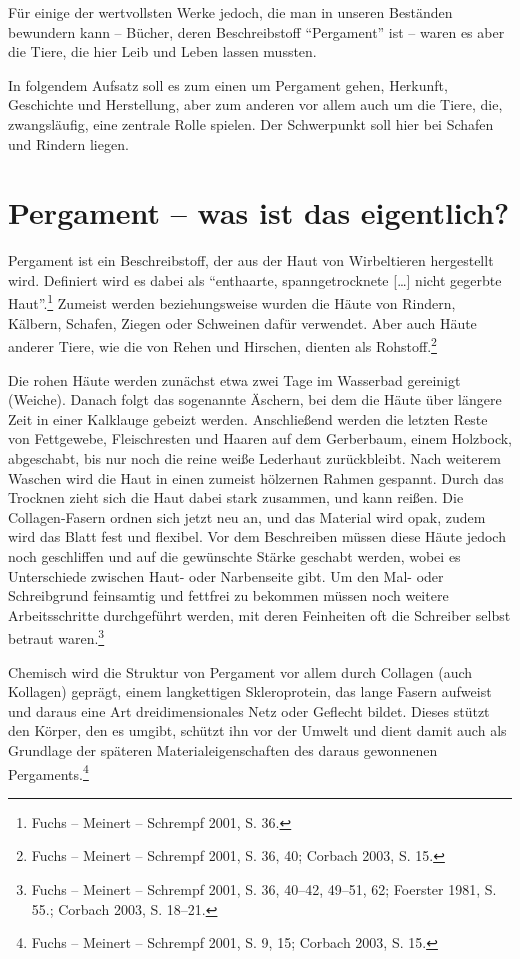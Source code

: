 \documentclass[a4paper,
fontsize=11pt,
oneside,
numbers=noperiodatend,
parskip=half-,
bibliography=totoc,
final
]{scrartcl}
\begin{document}
Für einige der wertvollsten Werke jedoch, die man in unseren Beständen
bewundern kann – Bücher, deren Beschreibstoff \enquote{Pergament} ist –
waren es aber die Tiere, die hier Leib und Leben lassen mussten.

In folgendem Aufsatz soll es zum einen um Pergament gehen, Herkunft,
Geschichte und Herstellung, aber zum anderen vor allem auch um die
Tiere, die, zwangsläufig, eine zentrale Rolle spielen. Der Schwerpunkt
soll hier bei Schafen und Rindern liegen.

\hypertarget{pergament-was-ist-das-eigentlich}{%
\section{Pergament -- was ist das
eigentlich?}\label{pergament-was-ist-das-eigentlich}}

Pergament ist ein Beschreibstoff, der aus der Haut von Wirbeltieren
hergestellt wird. Definiert wird es dabei als \enquote{enthaarte,
spanngetrocknete {[}\ldots{]} nicht gegerbte Haut}.\footnote{Fuchs --
  Meinert -- Schrempf 2001, S. 36.} Zumeist werden beziehungsweise
wurden die Häute von Rindern, Kälbern, Schafen, Ziegen oder Schweinen
dafür verwendet. Aber auch Häute anderer Tiere, wie die von Rehen und
Hirschen, dienten als Rohstoff.\footnote{Fuchs -- Meinert -- Schrempf
  2001, S. 36, 40; Corbach 2003, S. 15.}

Die rohen Häute werden zunächst etwa zwei Tage im Wasserbad gereinigt
(Weiche). Danach folgt das sogenannte Äschern, bei dem die Häute über
längere Zeit in einer Kalklauge gebeizt werden. Anschließend werden die
letzten Reste von Fettgewebe, Fleischresten und Haaren auf dem
Gerberbaum, einem Holzbock, abgeschabt, bis nur noch die reine weiße
Lederhaut zurückbleibt. Nach weiterem Waschen wird die Haut in einen
zumeist hölzernen Rahmen gespannt. Durch das Trocknen zieht sich die
Haut dabei stark zusammen, und kann reißen. Die Collagen-Fasern ordnen
sich jetzt neu an, und das Material wird opak, zudem wird das Blatt fest
und flexibel. Vor dem Beschreiben müssen diese Häute jedoch noch
geschliffen und auf die gewünschte Stärke geschabt werden, wobei es
Unterschiede zwischen Haut- oder Narbenseite gibt. Um den Mal- oder
Schreibgrund feinsamtig und fettfrei zu bekommen müssen noch weitere
Arbeitsschritte durchgeführt werden, mit deren Feinheiten oft die
Schreiber selbst betraut waren.\footnote{Fuchs -- Meinert -- Schrempf
  2001, S. 36, 40--42, 49--51, 62; Foerster 1981, S. 55.; Corbach 2003,
  S. 18--21.}

Chemisch wird die Struktur von Pergament vor allem durch Collagen (auch
Kollagen) geprägt, einem langkettigen Skleroprotein, das lange Fasern
aufweist und daraus eine Art dreidimensionales Netz oder Geflecht
bildet. Dieses stützt den Körper, den es umgibt, schützt ihn vor der
Umwelt und dient damit auch als Grundlage der späteren
Materialeigenschaften des daraus gewonnenen Pergaments.\footnote{Fuchs
  -- Meinert -- Schrempf 2001, S. 9, 15; Corbach 2003, S. 15.}
\end{document}

